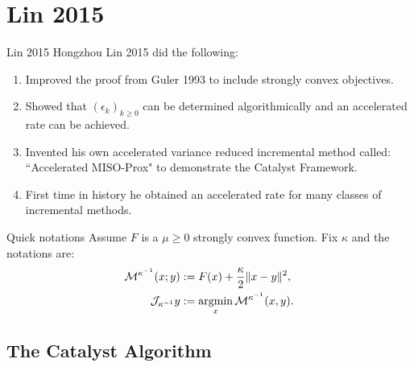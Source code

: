 \documentclass[11pt]{beamer}
\begin{document}
\section{Lin 2015}
    \begin{frame}{Lin 2015}
        Hongzhou Lin 2015 \cite{lin_universal_2015} did the following: 
        {\small
        \begin{enumerate}
            \item Improved the proof from Guler 1993 to include strongly convex objectives. 
            \item Showed that $(\epsilon_k)_{k\ge 0}$ can be determined algorithmically and  an accelerated rate can be achieved. 
            \item Invented his own accelerated variance reduced incremental method called: ``Accelerated MISO-Prox" to demonstrate the Catalyst Framework. 
            \item First time in history he obtained an accelerated rate for many classes of incremental methods. 
        \end{enumerate}
        }
        \begin{block}{Quick notations}
            Assume $F$ is a $\mu \ge 0$ strongly convex function. 
            Fix $\kappa$ and the notations are: 
            \begin{align*}
                \mathcal M^{\kappa^{-1}}(x; y) &:= F(x) + \frac{\kappa}{2}\Vert x - y\Vert^2, 
                \\
                \mathcal J_{\kappa^{-1}} y &:= \mathop{\rm argmin}\limits_x \mathcal M^{\kappa^{-1}} (x, y). 
            \end{align*}
        \end{block}
    \end{frame}
    \subsection{The Catalyst Algorithm}
\end{document}
